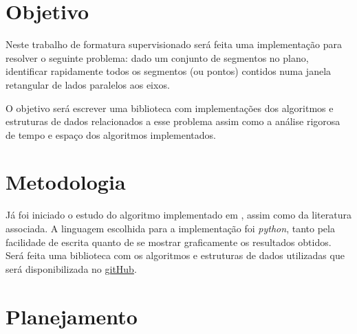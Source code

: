 \documentclass[10pt,twoside,a4paper]{article}
\begin{document}
\section{Objetivo}
\doublespacing

\par Neste trabalho de formatura supervisionado será feita uma implementação para resolver o seguinte problema: dado um conjunto de segmentos no plano, identificar rapidamente todos os segmentos (ou pontos) contidos numa janela retangular de lados paralelos aos eixos. \par O objetivo será escrever uma biblioteca com implementações dos algoritmos e estruturas de dados relacionados a esse problema assim como a análise rigorosa de tempo e espaço dos algoritmos implementados.
\section{Metodologia}
\doublespacing

\par Já foi iniciado o estudo do algoritmo implementado em \cite{alvaro}, assim como da literatura associada. A linguagem escolhida para a implementação foi \textit{python}, tanto pela facilidade de escrita quanto de se  mostrar graficamente os resultados obtidos. Será feita uma biblioteca com os algoritmos e estruturas de dados utilizadas que será disponibilizada no \href{http://github.com/mlordx/mac0499}{gitHub}.
\newpage
\section{Planejamento}
\doublespacing
\end{document}

